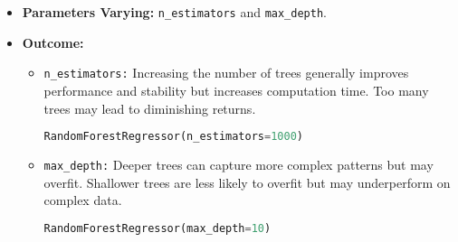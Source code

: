 \begin{itemize}
    \item \textbf{Parameters Varying:} \texttt{n\_estimators} and \texttt{max\_depth}.
    \item \textbf{Outcome:}
    \begin{itemize}
        \item \texttt{n\_estimators:} Increasing the number of trees generally improves performance and stability but increases computation time. Too many trees may lead to diminishing returns.
        \begin{lstlisting}[language=Python, caption=Increasing Value of \texttt{n\_estimators}]
RandomForestRegressor(n_estimators=1000)
		\end{lstlisting}
        \item \texttt{max\_depth:} Deeper trees can capture more complex patterns but may overfit. Shallower trees are less likely to overfit but may underperform on complex data.
        \begin{lstlisting}[language=Python, caption=Increasing Value of \texttt{max\_depth}]
RandomForestRegressor(max_depth=10)
		\end{lstlisting}
    \end{itemize}
\end{itemize}

\clearpage